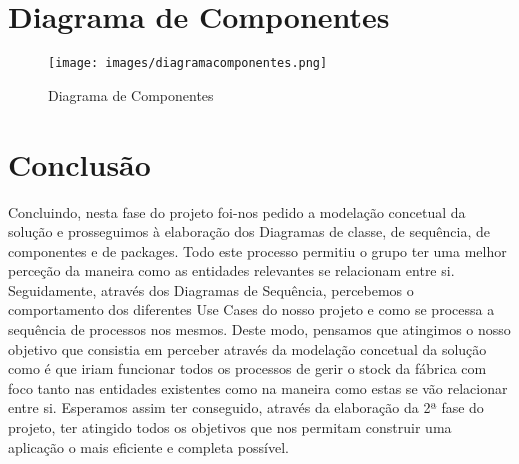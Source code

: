 \documentclass[11pt]{article}
\begin{document}
\clearpage

\section{Diagrama de Componentes}

\begin{figure}[htb]
    \centering
    \texttt{[image: images/diagramacomponentes.png]}
    \caption{Diagrama de Componentes}
    \label{fig:my_label3}
\end{figure}

\clearpage

\section{Conclusão}

Concluindo, nesta fase do projeto foi-nos pedido a modelação concetual da solução e prosseguimos à elaboração dos Diagramas de classe, de sequência, de componentes e de packages. Todo este processo permitiu o grupo ter uma melhor perceção da maneira como as entidades relevantes se relacionam entre si. Seguidamente, através dos Diagramas de Sequência, percebemos o comportamento dos diferentes Use Cases do nosso projeto e como se processa a sequência de processos nos mesmos. Deste modo, pensamos que atingimos o nosso objetivo que consistia em perceber através da modelação concetual da solução como é que iriam funcionar todos os processos de gerir o stock da fábrica com foco tanto nas entidades existentes como na maneira como estas se vão relacionar entre si. Esperamos assim ter conseguido, através da elaboração da 2ª fase do projeto, ter atingido todos os objetivos que nos permitam construir uma aplicação o mais eficiente e completa possível.
\end{document}
